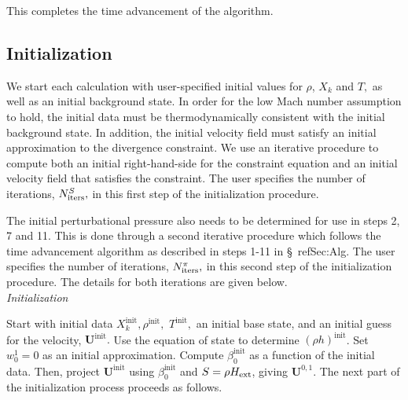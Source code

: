 \documentclass[11pt]{article}
\newcommand{\Hext}{{H_{\rm ext}}}
\newcommand{\initp}{\mathrm{init}}
\newcommand{\ubold}{\mathbf{U}}
\begin{document}
\noindent This completes the time advancement of the algorithm.



\subsection{Initialization}\label{Sec:Initialization}

We start each calculation with user-specified initial values for
$\rho$, $X_k$ and $T,$ as well as an initial background state.  In
order for the low Mach number assumption to hold, the initial data
must be thermodynamically consistent with the initial background
state.  In addition, the initial velocity field must satisfy an
initial approximation to the divergence constraint.  We use an iterative
procedure to compute both an initial right-hand-side for the
constraint equation and an initial velocity field that satisfies
the constraint.  The user specifies the number of iterations,
$N_{\rm iters}^{S},$ in this first step of the initialization procedure.

The initial perturbational pressure also needs to be determined for
use in steps 2, 7 and 11. 
This is done through a second iterative procedure which follows the
time advancement algorithm as described in steps 1-11 in \S~ref{Sec:Alg}.  
The user specifies the number of iterations, 
$N_{\rm iters}^{\pi},$ in this second step of the initialization procedure.
The details for both iterations are given below.\\

 {\em Initialization}

Start with initial data $X_k^{\initp}, \rho^{\initp},$ $T^{\initp},$ an 
initial base state, and an initial guess for the velocity, $\ubold^{\initp}.$
Use the equation of state to determine $(\rho h)^{\initp}$.  Set
$w_0^1 = 0$ as an initial approximation.  Compute $\beta_0^{\initp}$ as a function of 
the initial data.  Then, project $\ubold^{\initp}$ using $\beta_0^{\initp}$ and 
$S = \rho\Hext$, giving $\ubold^{0,1}$.  The next part of the initialization process 
proceeds as follows.
\end{document}
